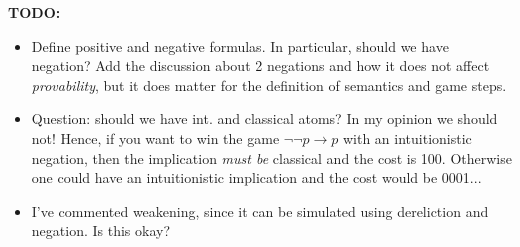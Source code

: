 {\bf TODO:}
\begin{itemize}
\item Define positive and negative formulas. In particular, should we have negation? Add the discussion about 2 negations and how it does not affect {\em provability}, but it does matter for the definition of semantics and game steps.
\item Question: should we have int. and classical atoms? In my opinion we should not! Hence, if you want to win the game $\neg\neg p\to p$ with an intuitionistic negation, then the implication {\em must be}  classical and the cost is 100. Otherwise one could have an intuitionistic implication and the cost would be 0001...
\item I've commented weakening, since it can be simulated using dereliction and negation. Is this okay?
\end{itemize}


